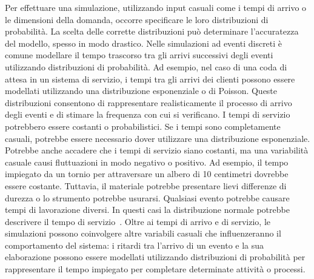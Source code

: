 \documentclass[12pt,a4paper,openright,twoside]{book}
\begin{document}
Per effettuare una simulazione, utilizzando input casuali come i tempi di arrivo o le dimensioni della domanda, occorre specificare le loro distribuzioni di probabilità. La scelta delle corrette distribuzioni può determinare l'accuratezza del modello, spesso in modo drastico. 
Nelle simulazioni ad eventi discreti è comune modellare il tempo trascorso tra gli arrivi successivi degli eventi utilizzando distribuzioni di probabilità. 
Ad esempio, nel caso di una coda di attesa in un sistema di servizio, i tempi tra gli arrivi dei clienti possono essere modellati utilizzando una distribuzione esponenziale o di Poisson. Queste distribuzioni consentono di rappresentare realisticamente il processo di arrivo degli eventi e di stimare la frequenza con cui si verificano.
I tempi di servizio potrebbero essere costanti o probabilistici. Se i tempi sono completamente casuali, potrebbe essere necessario dover utilizzare una distribuzione esponenziale. Potrebbe anche accadere che i tempi di servizio siano costanti, ma una variabilità casuale causi fluttuazioni in modo negativo o positivo. Ad esempio, il tempo impiegato da un tornio per attraversare un albero di 10 centimetri dovrebbe essere costante. Tuttavia, il materiale potrebbe presentare lievi differenze di durezza o lo strumento potrebbe usurarsi. Qualsiasi evento potrebbe causare tempi di lavorazione diversi. In questi casi la distribuzione normale potrebbe descrivere il tempo di servizio~\cite{DBLP:books/daglib/0034857}.
Oltre ai tempi di arrivo e di servizio, le simulazioni possono coinvolgere altre variabili casuali che influenzeranno il comportamento del sistema: i ritardi tra l'arrivo di un evento e la sua elaborazione possono essere modellati utilizzando distribuzioni di probabilità per rappresentare il tempo impiegato per completare determinate attività o processi. 
\end{document}
